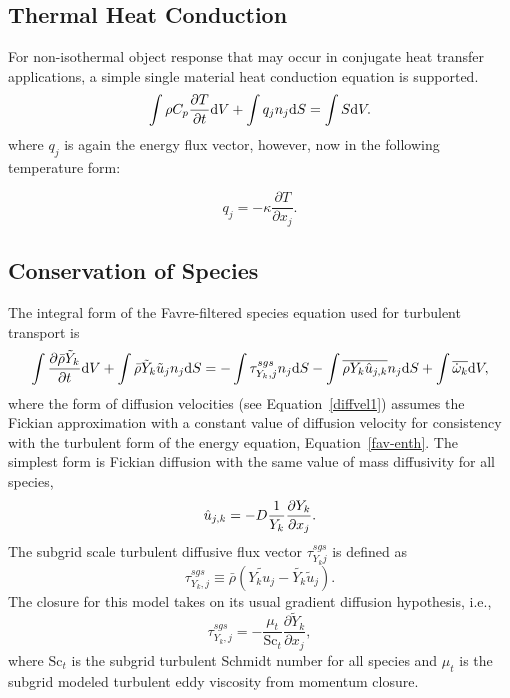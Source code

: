 \subsection{Thermal Heat Conduction}

For non-isothermal object response that may occur in conjugate heat transfer
applications, a simple single material heat conduction equation is supported.
%
\begin{equation}
  \int \rho C_p \frac{\partial T} {\partial t} {\rm d}V
  + \int q_j n_j {\rm d}S = \int S {\rm d}V.
\label{thermalHeatEquation}
\end{equation}
where $q_j$ is again the energy flux vector, however, now in the following 
temperature form:

\begin{equation}
 q_j = -\kappa \frac{\partial T}{\partial x_j}.
\end{equation}

\subsection{Conservation of Species}

The integral form of the Favre-filtered species equation used for
turbulent transport is
%
\begin{equation}
  \int {{\partial \bar{\rho} \tilde{Y}_k} \over {\partial t}} {\rm d}V
  + \int \bar{\rho} \tilde{Y}_k \tilde{u}_j n_j {\rm d}S = 
  - \int \tau^{sgs}_{Y_k,j} n_j {\rm d}S
  - \int \overline{\rho Y_k \hat{u}_{j,k}} n_j {\rm d}S + 
   \int \overline{\dot{\omega}_k} {\rm d}V,
\label{fav-species}
\end{equation}
%
where the form of diffusion velocities (see Equation~\ref{diffvel1}) assumes 
the Fickian approximation with a constant value of diffusion velocity 
for consistency with the turbulent form of the energy equation, 
Equation~\ref{fav-enth}. The simplest form is Fickian diffusion with the same  
value of mass diffusivity for all species,  
%
\begin{equation}
  \hat{u}_{j,k}= - D {1 \over {Y_k}} 
                   {{\partial Y_k} \over {\partial x_j}} .
  \label{diffvel1}
\end{equation}
%
The subgrid scale turbulent diffusive flux vector $\tau^{sgs}_{Y_kj}$ is defined as
%
\begin{equation}
\tau^{sgs}_{Y_k,j} \equiv \bar{\rho} \left( \widetilde{Y_k u_j} - 
     \tilde{Y_k} \tilde{u}_j \right).
\end{equation}
%
The closure for this model takes on its usual gradient diffusion hypothesis, i.e.,
%
\begin{equation}
\tau^{sgs}_{Y_k,j} = - \frac{\mu_t}{\mathrm{Sc}_t} \frac{\partial 
     \tilde{Y}_k}{\partial x_j}, 
\end{equation}
%
where $\mathrm{Sc}_t$ is the subgrid turbulent Schmidt number for all
species and $\mu_t$ is the subgrid modeled turbulent eddy viscosity from
momentum closure.

